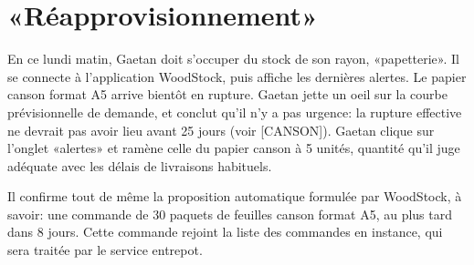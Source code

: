 \section{«Réapprovisionnement»}

En ce lundi matin, Gaetan doit s'occuper du stock de son rayon, «papetterie».
Il se connecte à l'application WoodStock, puis affiche les dernières alertes.
Le papier canson format A5 arrive bientôt en rupture.
Gaetan jette un oeil sur la courbe prévisionnelle de demande, et conclut qu'il n'y a pas urgence: la rupture effective ne devrait pas avoir lieu avant 25 jours (voir [CANSON]).
Gaetan clique sur l'onglet «alertes» et ramène celle du papier canson à 5 unités, quantité qu'il juge adéquate avec les délais de livraisons habituels.\par
Il confirme tout de même la proposition automatique formulée par WoodStock, à savoir: une commande de 30 paquets de feuilles canson format A5, au plus tard dans 8 jours.
Cette commande rejoint la liste des commandes en instance, qui sera traitée par le service entrepot.

